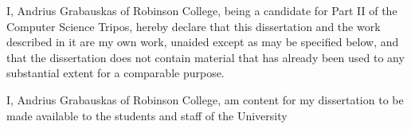 \documentclass[dissertation.tex]{subfiles}
\begin{document}
I, Andrius Grabauskas of Robinson College, being a candidate for Part II of the
Computer Science Tripos, hereby declare that this dissertation and the work
described in it are my own work, unaided except as may be specified below, and
that the dissertation does not contain material that has already been used to
any substantial extent for a comparable purpose.

I, Andrius Grabauskas of Robinson College, am content for my dissertation to be
made available to the students and staff of the University

\bigskip
{}

\medskip
{} 

\newpage
\end{document}
